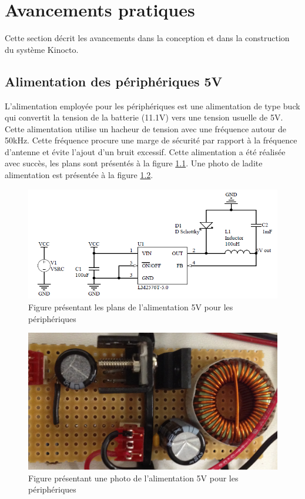 


\chapter{Avancements pratiques}
\label{s:avancement}
Cette section décrit les avancements dans la conception et dans la construction du système Kinocto.
\section{Alimentation des périphériques 5V}
L'alimentation employée pour les périphériques est une alimentation de type buck qui convertit la tension de la batterie (11.1V) vers une tension usuelle de 5V. Cette alimentation utilise un hacheur de tension avec une fréquence autour de 50kHz. Cette fréquence procure une marge de sécurité par rapport à la fréquence d'antenne et évite l'ajout d'un bruit excessif. Cette alimentation a été réalisée avec succès, les plans sont présentés à la figure \ref{fig:alim5V}. Une photo de ladite alimentation est présentée à la figure \ref{fig:alim5Vphoto}.

\begin{figure}[htbp]
\centering
\includegraphics[scale=0.5]{fig/alim_5V.png}
\caption{Figure présentant les plans de l'alimentation 5V pour les périphériques}
\label{fig:alim5V}
\end{figure}

\begin{figure}[htbp]
\centering
\includegraphics[scale=0.2]{fig/alim_5V_photo.png}
\caption{Figure présentant une photo de l'alimentation 5V pour les périphériques}
\label{fig:alim5Vphoto}
\end{figure}


